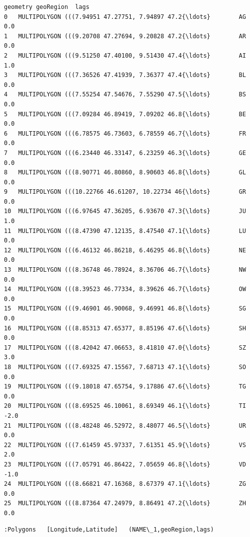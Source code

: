 \documentclass[11pt]{article}
\begin{document}
\begin{tcolorbox}[breakable, size=fbox, boxrule=.5pt, pad at break*=1mm, opacityfill=0]
\begin{Verbatim}[commandchars=\\\{\}]
                                             geometry geoRegion  lags
0   MULTIPOLYGON (((7.94951 47.27751, 7.94897 47.2{\ldots}        AG   0.0
1   MULTIPOLYGON (((9.20708 47.27694, 9.20828 47.2{\ldots}        AR   0.0
2   MULTIPOLYGON (((9.51250 47.40100, 9.51430 47.4{\ldots}        AI   1.0
3   MULTIPOLYGON (((7.36526 47.41939, 7.36377 47.4{\ldots}        BL   0.0
4   MULTIPOLYGON (((7.55254 47.54676, 7.55290 47.5{\ldots}        BS   0.0
5   MULTIPOLYGON (((7.09284 46.89419, 7.09202 46.8{\ldots}        BE   0.0
6   MULTIPOLYGON (((6.78575 46.73603, 6.78559 46.7{\ldots}        FR   0.0
7   MULTIPOLYGON (((6.23440 46.33147, 6.23259 46.3{\ldots}        GE   0.0
8   MULTIPOLYGON (((8.90771 46.80860, 8.90603 46.8{\ldots}        GL   0.0
9   MULTIPOLYGON (((10.22766 46.61207, 10.22734 46{\ldots}        GR   0.0
10  MULTIPOLYGON (((6.97645 47.36205, 6.93670 47.3{\ldots}        JU   1.0
11  MULTIPOLYGON (((8.47390 47.12135, 8.47540 47.1{\ldots}        LU   0.0
12  MULTIPOLYGON (((6.46132 46.86218, 6.46295 46.8{\ldots}        NE   0.0
13  MULTIPOLYGON (((8.36748 46.78924, 8.36706 46.7{\ldots}        NW   0.0
14  MULTIPOLYGON (((8.39523 46.77334, 8.39626 46.7{\ldots}        OW   0.0
15  MULTIPOLYGON (((9.46901 46.90068, 9.46991 46.8{\ldots}        SG   0.0
16  MULTIPOLYGON (((8.85313 47.65377, 8.85196 47.6{\ldots}        SH   0.0
17  MULTIPOLYGON (((8.42042 47.06653, 8.41810 47.0{\ldots}        SZ   3.0
18  MULTIPOLYGON (((7.69325 47.15567, 7.68713 47.1{\ldots}        SO   0.0
19  MULTIPOLYGON (((9.18018 47.65754, 9.17886 47.6{\ldots}        TG   0.0
20  MULTIPOLYGON (((8.69525 46.10061, 8.69349 46.1{\ldots}        TI  -2.0
21  MULTIPOLYGON (((8.48248 46.52972, 8.48077 46.5{\ldots}        UR   0.0
22  MULTIPOLYGON (((7.61459 45.97337, 7.61351 45.9{\ldots}        VS   2.0
23  MULTIPOLYGON (((7.05791 46.86422, 7.05659 46.8{\ldots}        VD  -1.0
24  MULTIPOLYGON (((8.66821 47.16368, 8.67379 47.1{\ldots}        ZG   0.0
25  MULTIPOLYGON (((8.87364 47.24979, 8.86491 47.2{\ldots}        ZH   0.0
\end{Verbatim}
\end{tcolorbox}
        
    
    
            \begin{tcolorbox}[breakable, size=fbox, boxrule=.5pt, pad at break*=1mm, opacityfill=0]
\begin{Verbatim}[commandchars=\\\{\}]
:Polygons   [Longitude,Latitude]   (NAME\_1,geoRegion,lags)
\end{Verbatim}
\end{tcolorbox}
        
\end{document}
